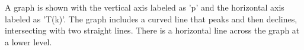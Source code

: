 A graph is shown with the vertical axis labeled as 'p' and the horizontal axis labeled as 'T(k)'. The graph includes a curved line that peaks and then declines, intersecting with two straight lines. There is a horizontal line across the graph at a lower level.
